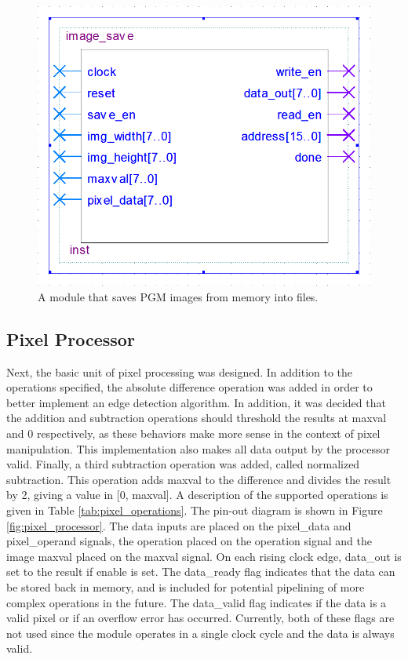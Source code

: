 \documentclass[a4paper, 10pt, titlepage]{article}
\begin{document}
\begin{figure}
    \centering
    \includegraphics[width=0.5\linewidth]{image_save_entity.PNG}
    \caption{A module that saves PGM images from memory into files.}
    \label{fig:image_save}
\end{figure}

\subsection{Pixel Processor}

Next, the basic unit of pixel processing was designed. In addition to the operations specified, the absolute difference operation was added in order to better implement an edge detection algorithm. In addition, it was decided that the addition and subtraction operations should threshold the results at maxval and 0 respectively, as these behaviors make more sense in the context of pixel manipulation. This implementation also makes all data output by the processor valid. Finally, a third subtraction operation was added, called normalized subtraction. This operation adds maxval to the difference and divides the result by 2, giving a value in [0, maxval]. A description of the supported operations is given in Table \ref{tab:pixel_operations}. The pin-out diagram is shown in Figure \ref{fig:pixel_processor}. The data inputs are placed on the pixel\_data and pixel\_operand signals, the operation placed on the operation signal and the image maxval placed on the maxval signal. On each rising clock edge, data\_out is set to the result if enable is set. The data\_ready flag indicates that the data can be stored back in memory, and is included for potential pipelining of more complex operations in the future. The data\_valid flag indicates if the data is a valid pixel or if an overflow error has occurred. Currently, both of these flags are not used since the module operates in a single clock cycle and the data is always valid.
\end{document}
